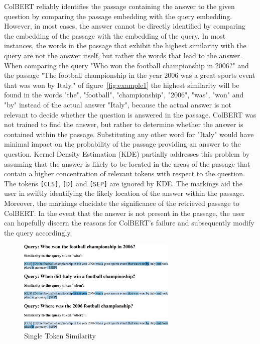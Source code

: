\documentclass[11pt]{article}
\begin{document}
ColBERT reliably identifies the passage containing the answer to the given question by comparing the passage embedding with the query embedding. 
However, in most cases, the answer cannot be directly identified by comparing the embedding of the passage with the embedding of the query.
In most instances, the words in the passage that exhibit the highest similarity with the query are not the answer itself, but rather the words 
that lead to the answer.
When comparing the query "Who won the football championship in 2006?" and the passage "The football championship in the year 2006 was a great 
sports event that was won by Italy." of figure~\ref{fig:example1} the highest similarity will be found in the words "the", "football", "championship", "2006", "was", 
"won" and "by" instead  of the actual answer "Italy", because the actual answer is not relevant to decide whether the question is answered 
in the passage. 
ColBERT was not trained to find the answer, but rather to determine whether the answer is contained within the passage.
Substituting any other word for "Italy" would have minimal impact on the probability of the passage providing an answer to the question.
Kernel Density Estimation (KDE) partially addresses this problem by assuming that the answer is likely to be located in the areas of the passage 
that contain a higher concentration of relevant tokens with respect to the question.
The tokens \texttt{[CLS]}, \texttt{[D]} and \texttt{[SEP]} are ignored by KDE.
The markings aid the user in swiftly identifying the likely location of the answer within the passage. Moreover, the markings elucidate the 
significance of the retrieved passage to ColBERT. 
In the event that the answer is not present in the passage, the user can hopefully discern the reasons for ColBERT's failure and
subsequently modify the query accordingly.
 
\begin{figure}[h]
	\includegraphics[width = 7.6cm, left]{"./images/first_word_heatmap.png"}
	\caption{Single Token Similarity}
	\label{fig:example2}
\end{figure} 
 
\end{document}
